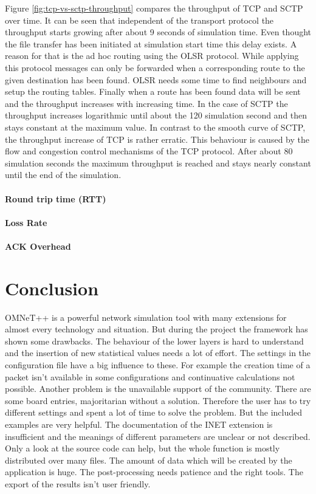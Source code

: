 \documentclass[a4paper]{article}
\begin{document}
Figure \ref{fig:tcp-vs-sctp-throughput} compares the throughput of TCP and SCTP over time. It can be seen that independent of the transport protocol the throughput starts growing after about 9 seconds of simulation time. Even thought the file transfer has been initiated at simulation start time this delay exists. A reason for that is the ad hoc routing using the OLSR protocol. While applying this protocol messages can only be forwarded when a corresponding route to the given destination has been found. OLSR needs some time to find neighbours and setup the routing tables. 
Finally when a route has been found data will be sent and the throughput increases with increasing time. In the case of SCTP the throughput increases logarithmic until about the 120 simulation second and then stays constant at the maximum value. In contrast to the smooth curve of SCTP, the throughput increase of TCP is rather erratic. This behaviour is caused by the flow and congestion control mechanisms of the TCP protocol. After about 80 simulation seconds the maximum throughput is reached and stays nearly constant until the end of the simulation.

\paragraph{Round trip time (RTT)}

\paragraph{Loss Rate}

\paragraph{ACK Overhead}

\section{Conclusion}
OMNeT++ is a powerful network simulation tool with many extensions for almost every technology and situation. But during the project the framework has shown some drawbacks. The behaviour of the lower layers is hard to understand and the insertion of new statistical values needs a lot of effort. The settings in the configuration file have a big influence to these. For example the creation time of a packet isn't available in some configurations and continuative calculations not possible.
Another problem is the unavailable support of the community. There are some board entries, majoritarian without a solution. Therefore the user has to try different settings and spent a lot of time to solve the problem. But the included examples are very helpful.
The documentation of the INET extension is insufficient and the meanings of different parameters are unclear or not described. Only a look at the source code can help, but the whole function is mostly distributed over many files.
The amount of data which will be created by the application is huge. The post-processing needs patience and the right tools. The export of the results isn't user friendly.
\end{document}

